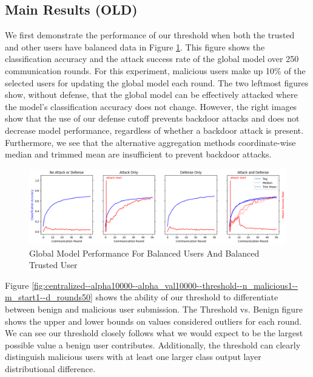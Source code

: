 \documentclass{article} %
\begin{document}
%
\pagebreak
\subsection{Main Results (OLD)}

We first demonstrate the performance of our threshold when both the trusted and other users have balanced data in Figure \ref{fig:centralized--balanced--accuracy}. This figure shows the classification accuracy and the attack success rate of the global model over 250 communication rounds. For this experiment, malicious users make up 10\% of the selected users for updating the global model each round. The two leftmost figures show, without defense, that the global model can be effectively attacked where the model's classification accuracy does not change. However, the right images show that the use of our defense cutoff prevents backdoor attacks and does not decrease model performance, regardless of whether a backdoor attack is present. Furthermore, we see that the alternative aggregation methods coordinate-wise median and trimmed mean are insufficient to prevent backdoor attacks.

\begin{figure}[H]
    \centering
    \includegraphics[width=\textwidth]{cifar_10/tag/distributed/alpha10000--alpha_val10000/visuals/accuracy--m_start1---dba1.png}
    \caption{Global Model Performance For Balanced Users And Balanced Trusted User}
    \label{fig:centralized--balanced--accuracy}
\end{figure}

Figure \ref{fig:centralized--alpha10000--alpha_val10000--threshold--n_malicious1--m_start1--d_rounds50} shows the ability of our threshold to differentiate between benign and malicious user submission. The Threshold vs. Benign figure shows the upper and lower bounds on values considered outliers for each round. We can see our threshold closely follows what we would expect to be the largest possible value a benign user contributes. Additionally, the threshold can clearly distinguish malicious users with at least one larger class output layer distributional difference. 
\end{document}
